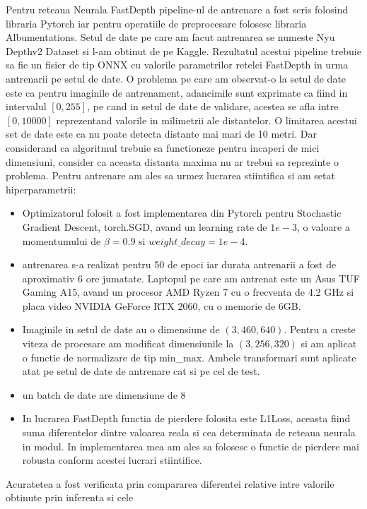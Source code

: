 \documentclass[12pt,a4paper]{report}
\begin{document}
Pentru reteaua Neurala FastDepth pipeline-ul de antrenare a fost scris folosind libraria Pytorch
iar pentru operatiile de preprocesare folosesc libraria Albumentations. Setul de date pe care 
am facut antrenarea se numeste Nyu Depthv2 Dataset si l-am obtinut de pe Kaggle. Rezultatul 
acestui pipeline trebuie sa fie un fisier de tip ONNX cu valorile parametrilor retelei FastDepth 
in urma antrenarii pe setul de date. O problema pe care am observat-o la setul de date este ca 
pentru imaginile de antrenament, adancimile sunt exprimate ca fiind in intervalul $ [0, 255] $, pe cand in setul 
de date de validare, acestea se afla intre $ [0, 10000] $ reprezentand valorile in milimetrii ale
distantelor. O limitarea acestui set de date este ca nu poate detecta distante mai mari de 10 metri.
Dar considerand ca algoritmul trebuie sa functioneze pentru incaperi de mici dimensiuni, consider ca 
aceasta distanta maxima nu ar trebui sa reprezinte o problema. Pentru antrenare am ales sa urmez lucrarea
stiintifica si am setat hiperparametrii:
\begin{itemize}
    \item Optimizatorul folosit a fost implementarea din Pytorch pentru Stochastic Gradient Descent, 
torch.SGD, avand un learning rate de $ 1e-3 $, o valoare a momentumului de $ \beta=0.9 $ si
$ weight\_decay=1e-4 $.
    \item antrenarea s-a realizat pentru 50 de epoci iar durata antrenarii a fost de aproximativ 
6 ore jumatate. Laptopul pe care am antrenat este un Asus TUF Gaming A15, avand un procesor AMD Ryzen 7 cu o frecventa 
de 4.2 GHz si placa video NVIDIA GeForce RTX 2060, cu o memorie de 6GB.\@
    \item Imaginile in setul de date au o dimensiune de $ (3, 460, 640) $. Pentru a creste viteza de procesare
am modificat dimensiunile la $ (3, 256, 320) $ si am aplicat o functie de normalizare de tip min\_max. Ambele 
transformari sunt aplicate atat pe setul de date de antrenare cat si pe cel de test.
    \item un batch de date are dimensiune de 8
    \item In lucrarea FastDepth functia de pierdere folosita este L1Loss, aceasta fiind suma diferentelor dintre valoarea 
reala si cea determinata de reteaua neurala in modul. In implementarea mea am ales sa folosesc o functie de pierdere 
mai robusta conform acestei lucrari stiintifice. 
\end{itemize}
Acuratetea a fost verificata  prin compararea diferentei relative intre valorile obtinute prin inferenta si cele 
\end{document}

